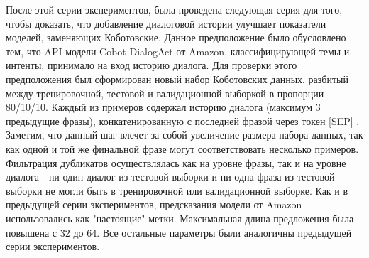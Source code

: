 После этой серии экспериментов, была проведена следующая серия для того, чтобы доказать, что добавление диалоговой истории улучшает показатели моделей, заменяющих Коботовские. Данное предположение было обусловлено тем, что API модели Cobot DialogAct от Amazon, классифицирующей темы и интенты, принимало на вход историю диалога. 
Для проверки этого предположения был сформирован новый набор Коботовских данных, разбитый между тренировочной, тестовой и валидационной выборкой в пропорции 80/10/10. Каждый из примеров содержал историю диалога (максимум 3 предыдущие фразы), конкатенированную с последней фразой через токен [SEP] . Заметим, что данный шаг влечет за собой увеличение размера набора данных, так как одной и той же финальной фразе могут соответствовать несколько примеров. Фильтрация дубликатов осуществлялась как на уровне фразы, так и на уровне диалога - ни один диалог из тестовой выборки и ни одна фраза из тестовой выборки не могли быть в тренировочной или валидационной выборке. Как и в предыдущей серии экспериментов, предсказания модели от Amazon использовались как "настоящие" метки. Максимальная длина предложения была повышена с 32 до 64. Все остальные параметры были аналогичны предыдущей серии экспериментов.


\begin{table}[htbp]
\centering
\caption {Accuracy(f1) с диалоговой историей для многозадачной модели с 1 линейным слоем, только Коботовские задачи}
\label{mtldream:2}
\end{table}


